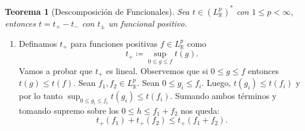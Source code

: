 \documentclass{article}
\newtheorem{Teorema}{Teorema}
\theoremstyle{plain}
\theoremstyle{definition}
\newcommand{\1}[1]{\mathbbm{1}\left( #1 \right)}
\newcommand{\R}{\mathbb{R}}
\begin{document}
\begin{Teorema}[Descomposición de Funcionales]
  Sea \(t\in (L^{p}_{\R})^{\ast}\) con \(1\le p< \infty\), entonces 
  \(t = t_{+} - t_{-}\) con \(t_{\pm}\) un funcional positivo.  
\end{Teorema}
\begin{Demostracion}
\begin{enumerate}[label={Paso~\theenumi:}]
  \item Definamos \(t_{+}\) para funciones positivas \(f\in L^{p}_{\R}\) como
  \begin{displaymath}
    t_{+} \coloneqq \sup_{0 \le g \le f} t(g).
  \end{displaymath}
  Vamos a probar que \(t_{+}\) es lineal. Observemos que
  si \(0\le g \le f\) entonces \(t(g) \le t(f)\). Sean \(f_1,f_2 \in L^{p}_{\R}\). Sean 
  \(0 \le g_i \le f_i\). Luego, \(t(g_i) \le t(f_i)\) y por lo tanto
  \(\sup_{0\le g_i \le f_i} t(g_i) \le t(f_i)\). Sumando ambos términos y tomando
  supremo sobre los \(0 \le h \le f_1 + f_2\) nos queda:
  \begin{displaymath}
    t_{+}(f_1) + t_{+}(f_2) \le t_{+}(f_1 + f_2).
  \end{displaymath}
\end{enumerate}
  
\end{Demostracion}
\end{document}
